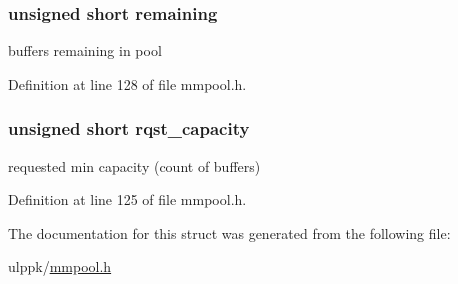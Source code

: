 \hypertarget{struct__bpmf__stats_af85fb64344a8ddeef73280d88e1389ca}{
\subsubsection[{remaining}]{\setlength{\rightskip}{0pt plus 5cm}unsigned short remaining}}\label{struct__bpmf__stats_af85fb64344a8ddeef73280d88e1389ca}


buffers remaining in pool 



Definition at line 128 of file mmpool.\-h.

\hypertarget{struct__bpmf__stats_ac445ecc06a5de1ce011330056aa9774b}{
\subsubsection[{rqst\-\_\-capacity}]{\setlength{\rightskip}{0pt plus 5cm}unsigned short rqst\-\_\-capacity}}\label{struct__bpmf__stats_ac445ecc06a5de1ce011330056aa9774b}


requested min capacity (count of buffers) 



Definition at line 125 of file mmpool.\-h.



The documentation for this struct was generated from the following file\-:\begin{DoxyCompactItemize}
\item 
ulppk/\hyperlink{mmpool_8h}{mmpool.\-h}\end{DoxyCompactItemize}
